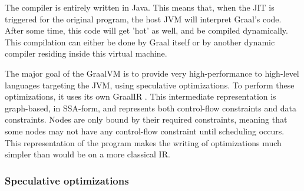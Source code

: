 \documentclass[twoside,11pt,a4paper]{article}
\begin{document}
The compiler is entirely written in Java. This means that, when the JIT is triggered for the original program, the host JVM will interpret Graal's code. After some time, this code will get 'hot' as well, and be compiled dynamically. This compilation can either be done by Graal itself or by another dynamic compiler residing inside this virtual machine.



The major goal of the GraalVM is to provide very high-performance to high-level languages targeting the JVM, using speculative optimizations. To perform these optimizations, it uses its own GraalIR \cite{graalir, graalspecoptir}. This intermediate representation is graph-based, in SSA-form, and represents both control-flow constraints and data constraints. Nodes are only bound by their required constraints, meaning that some nodes may not have any control-flow constraint until scheduling occurs. This representation of the program makes the writing of optimizations much simpler than would be on a more classical IR.




\subsubsection{Speculative optimizations}
\end{document}
